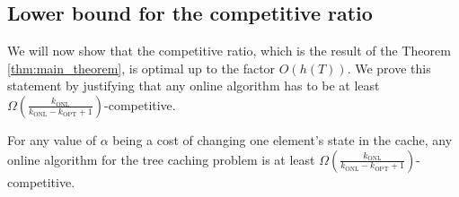 \subsection{Lower bound for the competitive ratio}
We will now show that the
competitive ratio, which is the result of the Theorem \ref{thm:main_theorem}, is
optimal up to the factor $O(h(T))$. We prove this statement by justifying that any
online algorithm has to be at least $\Omega
(\frac{k_{\mathrm{ONL}}}{k_{\mathrm{ONL}}- k_{\mathrm{OPT}} + 1})$-competitive.
\begin{theorem}
For any value of $\alpha$ being a cost of changing one element's
state in the cache, any online algorithm for the tree caching problem is at
least $\Omega (\frac{k_{\mathrm{ONL}}}{k_{\mathrm{ONL}}- k_{\mathrm{OPT}} +
1})$-competitive.
\end{theorem}
